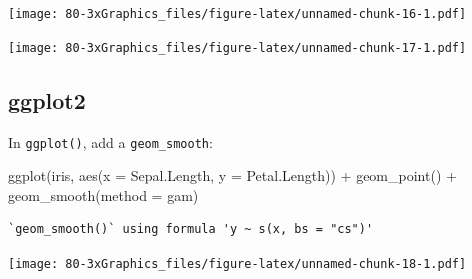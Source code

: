 \documentclass[
]{book}
\newenvironment{Shaded}{\begin{snugshade}}{\end{snugshade}}
\newcommand{\AttributeTok}[1]{\textcolor[rgb]{0.77,0.63,0.00}{#1}}
\newcommand{\FunctionTok}[1]{\textcolor[rgb]{0.00,0.00,0.00}{#1}}
\newcommand{\NormalTok}[1]{#1}
\newcommand{\SpecialCharTok}[1]{\textcolor[rgb]{0.00,0.00,0.00}{#1}}
\newcommand{\StringTok}[1]{\textcolor[rgb]{0.31,0.60,0.02}{#1}}
\begin{document}
\begin{Shaded}
\end{Shaded}

\texttt{[image: 80-3xGraphics\_files/figure-latex/unnamed-chunk-16-1.pdf]}

\begin{Shaded}
\end{Shaded}

\texttt{[image: 80-3xGraphics\_files/figure-latex/unnamed-chunk-17-1.pdf]}

\hypertarget{ggplot2-2}{%
\subsection{\texorpdfstring{\textbf{ggplot2}}{ggplot2}}\label{ggplot2-2}}

In \texttt{ggplot()}, add a \texttt{geom\_smooth}:

\begin{Shaded}
\begin{Highlighting}[]
\FunctionTok{ggplot}\NormalTok{(iris, }\FunctionTok{aes}\NormalTok{(}\AttributeTok{x =}\NormalTok{ Sepal.Length, }\AttributeTok{y =}\NormalTok{ Petal.Length)) }\SpecialCharTok{+}
  \FunctionTok{geom\_point}\NormalTok{() }\SpecialCharTok{+}
  \FunctionTok{geom\_smooth}\NormalTok{(}\AttributeTok{method =} \StringTok{\textquotesingle{}gam\textquotesingle{}}\NormalTok{)}
\end{Highlighting}
\end{Shaded}

\begin{verbatim}
`geom_smooth()` using formula 'y ~ s(x, bs = "cs")'
\end{verbatim}

\texttt{[image: 80-3xGraphics\_files/figure-latex/unnamed-chunk-18-1.pdf]}
\end{document}
